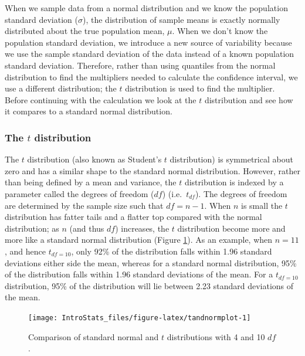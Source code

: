 \documentclass[
  oneside]{krantz}
\begin{document}
When we sample data from a normal distribution and we know the population standard deviation (\(\sigma\)), the distribution of sample means is exactly normally distributed about the true population mean, \(\mu\). When we don't know the population standard deviation, we introduce a new source of variability because we use the sample standard deviation of the data instead of a known population standard deviation. Therefore, rather than using quantiles from the normal distribution to find the multipliers needed to calculate the confidence interval, we use a different distribution; the \(t\) distribution is used to find the multiplier. Before continuing with the calculation we look at the \(t\) distribution and see how it compares to a standard normal distribution.

\hypertarget{the-t-distribution}{%
\subsubsection{\texorpdfstring{The \(t\) distribution}{The t distribution}}\label{the-t-distribution}}

The \(t\) distribution (also known as Student's \(t\) distribution) is symmetrical about zero and has a similar shape to the standard normal distribution. However, rather than being defined by a mean and variance, the \(t\) distribution is indexed by a parameter called the degrees of freedom (\(df\)) (i.e.~\(t_{df}\)). The degrees of freedom are determined by the sample size such that \(df=n-1\). When \(n\) is small the \(t\) distribution has fatter tails and a flatter top compared with the normal distribution; as \(n\) (and thus \(df\)) increases, the \(t\) distribution become more and more like a standard normal distribution (Figure \ref{fig:tandnormplot}). As an example, when \(n=11\), and hence \(t_{df=10}\), only 92\% of the distribution falls within 1.96 standard deviations either side the mean, whereas for a standard normal distribution, 95\% of the distribution falls within 1.96 standard deviations of the mean. For a \(t_{df=10}\) distribution, 95\% of the distribution will lie between 2.23 standard deviations of the mean.

\begin{figure}[!htb]

{\centering \texttt{[image: IntroStats\_files/figure-latex/tandnormplot-1]} 

}

\caption{Comparison of standard normal and $t$ distributions with 4 and 10 $df$.}\label{fig:tandnormplot}
\end{figure}
\end{document}
